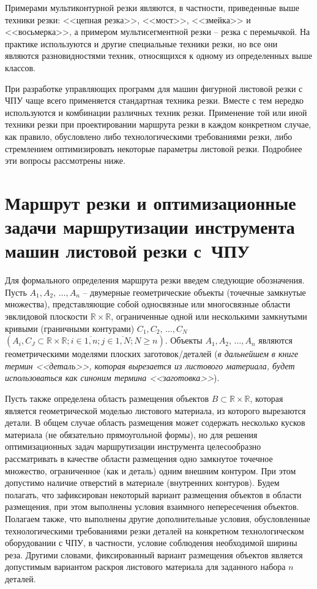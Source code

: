 \documentclass[11pt,twoside,openany]{report}
\begin{document}
Примерами мультиконтурной резки являются,
в частности, приведенные выше техники резки:
<<цепная резка>>, <<мост>>, <<змейка>> и <<восьмерка>>,
а примером мультисегментной резки --
резка с перемычкой.
На практике используются и другие специальные техники резки,
но все они являются разновидностями техник,
относящихся к одному из определенных выше классов.

При разработке управляющих программ для
машин фигурной листовой резки с ЧПУ чаще всего
применяется стандартная техника резки.
Вместе с тем нередко используются и
комбинации различных техник резки.
Применение той или иной техники резки
при проектировании маршрута резки в
каждом конкретном случае, как правило,
обусловлено либо технологическими требованиями резки,
либо стремлением оптимизировать некоторые
параметры листовой резки.
Подробнее эти вопросы рассмотрены ниже.

{\raggedright\section{
  Маршрут резки и оптимизационные задачи
  маршрутизации инструмента машин листовой
  резки с~ЧПУ
}}
\label{sect:1.2}
\setcounter{equation}{0}

Для формального определения маршрута резки
введем следующие обозначения.
Пусть
$A_1, A_2, \,\dots, A_n$
– двумерные геометрические объекты (точечные замкнутые множества),
представляющие собой односвязные или
многосвязные области эвклидовой плоскости
$\mathbb R \times \mathbb R$,
ограниченные одной или несколькими замкнутыми кривыми
(граничными контурами)
$C_1, C_2, \,\dots, C_N$
$(A_i, C_J \subset \mathbb R \times \mathbb R;
i \in \overline{1,n};
j \in \overline{1, N};
N \geqslant n)$.
Объекты
$A_1, A_2, \,\dots, A_n$
являются геометрическими моделями плоских заготовок/деталей
({\it в дальнейшем в книге термин <<деталь>>,
которая вырезается из листового материала,
будет использоваться как синоним термина <<заготовка>>}).

Пусть также определена область размещения объектов
$B \subset \mathbb R \times \mathbb R$,
которая является геометрической моделью листового материала,
из которого вырезаются детали.
В общем случае область размещения
может содержать несколько кусков материала
(не обязательно прямоугольной формы),
но для решения оптимизационных задач
маршрутизации инструмента целесообразно рассматривать
в качестве области размещения одно замкнутое точечное множество,
ограниченное (как и деталь)
одним внешним контуром.
При этом допустимо наличие отверстий в материале
(внутренних контуров).
Будем полагать, что зафиксирован некоторый вариант размещения
объектов в области размещения,
при этом выполнены условия взаимного непересечения объектов.
Полагаем также, что выполнены другие дополнительные условия,
обусловленные технологическими требованиями резки деталей
на конкретном технологическом оборудовании с ЧПУ,
в частности, условие соблюдения необходимой ширины реза.
Другими словами, фиксированный вариант размещения объектов
является допустимым вариантом раскроя листового материала
для заданного набора $n$ деталей.
\end{document}
